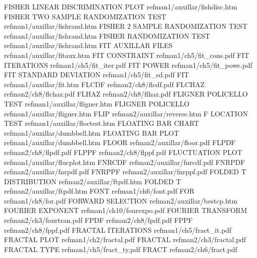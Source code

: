 FISHER LINEAR DISCRIMINATION PLOT       refman1/auxillar/fishdisc.htm
FISHER TWO SAMPLE RANDOMIZATION TEST    refman1/auxillar/fishrand.htm
FISHER 2 SAMPLE RANDOMIZATION TEST      refman1/auxillar/fishrand.htm
FISHER RANDOMIZATION TEST               refman1/auxillar/fishrand.htm
FIT AUXILLAR FILES                      refman1/auxillar/fitaux.htm
FIT CONSTRAINT                          refman1/ch5/fit_cons.pdf
FIT ITERATIONS                          refman1/ch5/fit_iter.pdf
FIT POWER                               refman1/ch5/fit_powe.pdf
FIT STANDARD DEVIATION                  refman1/ch5/fit_sd.pdf
FIT                                     refman1/auxillar/fit.htm
FLCDF                                   refman2/ch8/flcdf.pdf
FLCHAZ                                  refman2/ch8/flchaz.pdf
FLHAZ                                   refman2/ch8/flhaz.pdf
FLIGNER POLICELLO TEST                  refman1/auxillar/fligner.htm
FLIGNER POLICELLO                       refman1/auxillar/fligner.htm
FLIP                                    refman2/auxillar/reverse.htm
F LOCATION TEST                         refman1/auxillar/floctest.htm
FLOATING BAR CHART                      refman1/auxillar/dumbbell.htm
FLOATING BAR PLOT                       refman1/auxillar/dumbbell.htm
FLOOR                                   refman2/auxillar/floor.pdf
FLPDF                                   refman2/ch8/flpdf.pdf
FLPPF                                   refman2/ch8/flppf.pdf
FLUCTUATION PLOT                        refman1/auxillar/flucplot.htm
FNRCDF                                  refman2/auxillar/fnrcdf.pdf
FNRPDF                                  refman2/auxillar/fnrpdf.pdf
FNRPPF                                  refman2/auxillar/fnrppf.pdf
FOLDED T DISTRIBUTION                   refman2/auxillar/ftpdf.htm
FOLDED T                                refman2/auxillar/ftpdf.htm
FONT                                    refman1/ch6/font.pdf
FOR                                     refman1/ch8/for.pdf
FORWARD SELECTION                       refman2/auxillar/bestcp.htm
FOURIER EXPONENT                        refman1/ch10/fourexpo.pdf
FOURIER TRANSFORM                       refman2/ch3/fourtran.pdf
FPDF                                    refman2/ch8/fpdf.pdf
FPPF                                    refman2/ch8/fppf.pdf
FRACTAL ITERATIONS                      refman1/ch5/fract_it.pdf
FRACTAL PLOT                            refman1/ch2/fractal.pdf
FRACTAL                                 refman2/ch3/fractal.pdf
FRACTAL TYPE                            refman1/ch5/fract_ty.pdf
FRACT                                   refman2/ch6/fract.pdf
